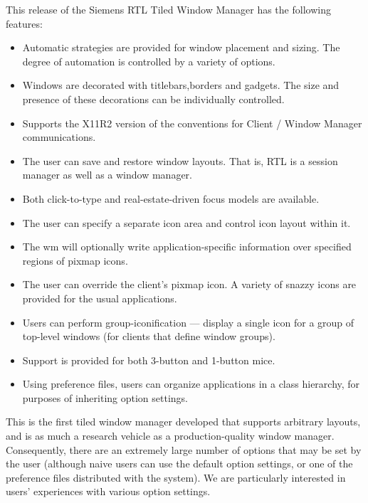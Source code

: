 This release of the Siemens RTL Tiled Window Manager has the following
features:

\begin{itemize}
\item Automatic strategies are provided for window placement and sizing.  The
degree of automation is controlled by a variety of options.

\item Windows are decorated with titlebars,borders and gadgets.  The size and
presence of these decorations can be individually controlled.

\item Supports the X11R2 version of the conventions for Client / Window Manager
communications.

\item The user can save and restore window layouts.  That is, RTL is a session
manager as well as a window manager.

\item Both click-to-type and real-estate-driven focus models are available.

\item The user can specify a separate icon area and control icon layout within
it.

\item The wm will optionally write application-specific information over
specified regions of pixmap icons.

\item The user can override the client's pixmap icon.  A variety of snazzy
icons are provided for the usual applications.

\item Users can perform group-iconification --- display a single icon for a
group of top-level windows (for clients that define window groups).

\item Support is provided for both 3-button and 1-button mice.

\item Using preference files, users can organize applications in a class
hierarchy, for purposes of inheriting option settings.
\end{itemize}

This is the first tiled window manager developed that supports arbitrary
layouts, and is as much a research vehicle as a production-quality window
manager.  Consequently, there are an extremely large number of options
that may be set by the user (although naive users can use the default
option settings, or one of the preference files distributed with the
system).  We are particularly interested in users' experiences with
various option settings.

